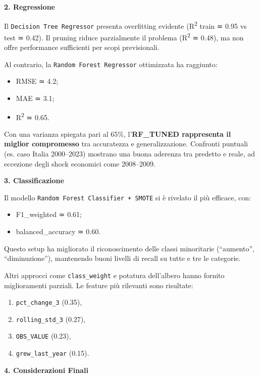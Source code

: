 \documentclass[conference]{IEEEtran}
\begin{document}
\begin{itemize}
\noindent\textbf{2. Regressione}

Il \texttt{Decision Tree Regressor} presenta overfitting evidente (R\textsuperscript{2} train ≃ 0.95 vs test ≃ 0.42). Il pruning riduce parzialmente il problema (R\textsuperscript{2} ≃ 0.48), ma non offre performance sufficienti per scopi previsionali.

Al contrario, la \texttt{Random Forest Regressor} ottimizzata ha raggiunto:

\begin{itemize}
  \item RMSE ≃ 4.2;
  \item MAE ≃ 3.1;
  \item R\textsuperscript{2} ≃ 0.65.
\end{itemize}

Con una varianza spiegata pari al 65\%, l’\textbf{RF\_TUNED rappresenta il miglior compromesso} tra accuratezza e generalizzazione. Confronti puntuali (es. caso Italia 2000–2023) mostrano una buona aderenza tra predetto e reale, ad eccezione degli shock economici come 2008–2009.

\noindent\textbf{3. Classificazione}

Il modello \texttt{Random Forest Classifier + SMOTE} si è rivelato il più efficace, con:

\begin{itemize}
  \item F1\_weighted ≃ 0.61;
  \item balanced\_accuracy ≃ 0.60.
\end{itemize}

Questo setup ha migliorato il riconoscimento delle classi minoritarie (“aumento”, “diminuzione”), mantenendo buoni livelli di recall su tutte e tre le categorie.

Altri approcci come \texttt{class\_weight} e potatura dell’albero hanno fornito miglioramenti parziali. Le feature più rilevanti sono risultate:

\begin{enumerate}
  \item \texttt{pct\_change\_3} (0.35),
  \item \texttt{rolling\_std\_3} (0.27),
  \item \texttt{OBS\_VALUE} (0.23),
  \item \texttt{grew\_last\_year} (0.15).
\end{enumerate}

\noindent\textbf{4. Considerazioni Finali}


\end{itemize}
\end{document}

